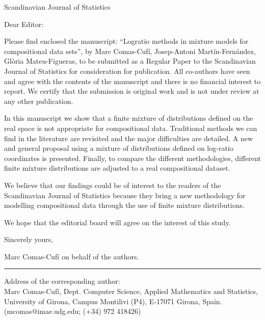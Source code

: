 \documentclass{letter}
\begin{document}
\begin{letter}{
Scandinavian Journal of Statistics}
\opening{Dear Editor:}

Please find enclosed the manuscript: “Logratio methods in mixture models for compositional data sets”, by Marc Comas-Cufí, Josep-Antoni Martín-Fernández, Glòria Mateu-Figueras, to be submitted as a Regular Paper to the Scandinavian Journal of Statistics for consideration for publication. All co-authors have seen and agree with the contents of the manuscript and there is no financial interest to report. We certify that the submission is original work and is not under review at any other publication.

In this manuscript we show that a finite mixture of distributions defined on the real space is not appropriate for compositional data. Traditional methods we can find in the literature are revisited and the major difficulties are detailed. A new and general proposal using a mixture of distributions defined on log-ratio coordinates is presented. Finally, to compare the different methodologies, different finite mixture distributions are adjusted to a real compositional dataset.

We believe that our findings could be of interest to the readers of the Scandinavian Journal of Statistics because they bring a new methodology for modelling compositional data through the use of finite mixture distributions. 

We hope that the editorial board will agree on the interest of this study.

Sincerely yours,

\bigskip

Marc Comas-Cufí on behalf of the authors.

\noindent\rule{8cm}{0.4pt}

Address of the corresponding author: \\
Marc Comas-Cufí,
Dept. Computer Science, Applied Mathematics and Statistics, University of Girona, Campus Montilivi (P4), E-17071 Girona, Spain. (mcomas@imae.udg.edu; (+34) 972 418426)

\end{letter}
\end{document}
